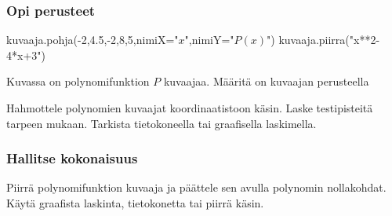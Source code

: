 \begin{tehtavasivu}

\subsubsection*{Opi perusteet}

\begin{tehtava}
\begin{kuva}
	kuvaaja.pohja(-2,4.5,-2,8,5,nimiX="$x$",nimiY="$P(x)$")
	kuvaaja.piirra("x**2-4*x+3")
\end{kuva}
Kuvassa on polynomifunktion $P$ kuvaajaa. Määritä on kuvaajan perusteella
\begin{vastaus}
\end{vastaus}
\end{tehtava}

\begin{tehtava}
    Hahmottele polynomien kuvaajat koordinaatistoon käsin. Laske testipisteitä tarpeen mukaan. Tarkista tietokoneella tai graafisella laskimella.
    \begin{vastaus}
    \end{vastaus}
\end{tehtava}

\subsubsection*{Hallitse kokonaisuus}

\begin{tehtava}
Piirrä polynomifunktion kuvaaja ja päättele sen avulla polynomin nollakohdat. Käytä graafista laskinta, tietokonetta tai piirrä käsin.
	\begin{vastaus}
	\end{vastaus}
\end{tehtava}


\end{tehtavasivu}
